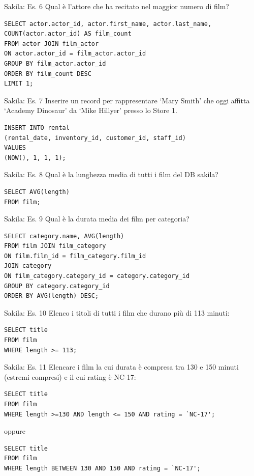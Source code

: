 %
\begin{frame}[fragile]{Sakila: Es. 6}
Qual \`e l'attore che ha recitato nel maggior numero di film?
\pause
\begin{lstlisting}
SELECT actor.actor_id, actor.first_name, actor.last_name,
COUNT(actor.actor_id) AS film_count
FROM actor JOIN film_actor
ON actor.actor_id = film_actor.actor_id
GROUP BY film_actor.actor_id
ORDER BY film_count DESC
LIMIT 1;
\end{lstlisting}
\end{frame}
%
\begin{frame}[fragile]{Sakila: Es. 7}
Inserire un record per rappresentare `Mary Smith' che oggi affitta `Academy Dinosaur' da `Mike Hillyer' presso lo Store 1.
\pause
\begin{lstlisting}
INSERT INTO rental
(rental_date, inventory_id, customer_id, staff_id)
VALUES
(NOW(), 1, 1, 1);
\end{lstlisting}
\end{frame}
%
\begin{frame}[fragile]{Sakila: Es. 8}
Qual \`e la lunghezza media di tutti i film del DB sakila?
\pause
\begin{lstlisting}
SELECT AVG(length)
FROM film;
\end{lstlisting}
\end{frame}
%
\begin{frame}[fragile]{Sakila: Es. 9}
Qual \`e la durata media dei film per categoria?
\pause
\begin{lstlisting}
SELECT category.name, AVG(length)
FROM film JOIN film_category
ON film.film_id = film_category.film_id
JOIN category
ON film_category.category_id = category.category_id
GROUP BY category.category_id
ORDER BY AVG(length) DESC;
\end{lstlisting}
\end{frame}
%
\begin{frame}[fragile]{Sakila: Es. 10}
Elenco i titoli di tutti i film che durano pi\`u di 113 minuti:
\pause
\begin{lstlisting}
SELECT title
FROM film
WHERE length >= 113;
\end{lstlisting}
\end{frame}
%
\begin{frame}[fragile]{Sakila: Es. 11}
Elencare i film la cui durata \`e compresa tra 130 e 150 minuti (estremi compresi) e il cui rating \`e NC-17:
\pause
\begin{lstlisting}
SELECT title
FROM film
WHERE length >=130 AND length <= 150 AND rating = `NC-17';
\end{lstlisting}
\pause
oppure
\begin{lstlisting}
SELECT title
FROM film
WHERE length BETWEEN 130 AND 150 AND rating = `NC-17';
\end{lstlisting}
\end{frame}
